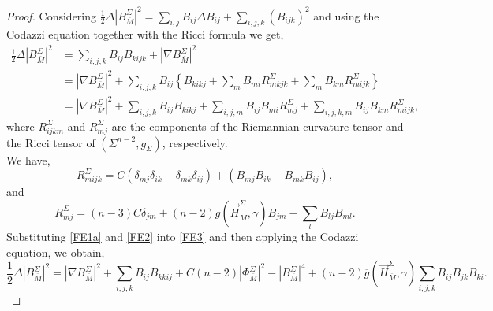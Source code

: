 \documentclass[11pt]{amsart}
\numberwithin{equation}{section}
\begin{document}
\begin{proof}
    Considering $\frac{1}{2} \Delta \left|B^{\Sigma}_{\overline{M}}\right|^2= \sum\limits_{i, j} B_{ij} \Delta B_{ij}+ \sum\limits_{i, j, k} (B_{ijk})^2$ and using the Codazzi equation together with the Ricci formula \cite{cheng} we get,
    \begin{align}\label{FE3}
        \frac{1}{2} \Delta \left|B^{\Sigma}_{\overline{M}}\right|^2 &= \sum_{i, j, k} B_{ij} B_{kijk}+ \left|\nabla B^{\Sigma}_{\overline{M}}\right|^2 \nonumber\\
                                          &= \left|\nabla B^{\Sigma}_{\overline{M}}\right|^2+ \sum_{i, j, k} B_{ij} \left\{B_{kikj}+\sum_m B_{mi} R^{\Sigma}_{mkjk}+\sum_m B_{km} R^{\Sigma}_{mijk}\right\} \nonumber\\
                                          &= \left|\nabla B^{\Sigma}_{\overline{M}}\right|^2+ \sum_{i, j, k} B_{ij} B_{kikj}+\sum_{i, j, m} B _{ij} B_{mi} R^{\Sigma}_{mj}+\sum_{i, j, k, m} B_{ij} B_{km} R^{\Sigma}_{mijk},
    \end{align}
    where $ R^{\Sigma}_{ijkm} $ and $R^{\Sigma}_{mj}$ are the components of the Riemannian curvature tensor and the Ricci tensor of $(\Sigma^{n-2}, g_{\Sigma})$, respectively.\\
    We have,
    \begin{equation}\label{FE2}
        R^{\Sigma}_{mijk}= C (\delta_{mj} \delta_{ik}- \delta_{mk} \delta_{ij})+(B_{mj} B_{ik}- B_{mk} B_{ij}),
    \end{equation}
    and
    \begin{equation}\label{FE1a}
        R^{\Sigma}_{mj}= (n-3) C \delta_{jm}+ (n-2) \overline{g}\left(\vec{H}^{\Sigma}_{\overline{M}}, \gamma \right) B_{jm}- \sum_l B_{lj} B_{ml}.
    \end{equation}
    Substituting \eqref{FE1a} and \eqref{FE2} into \eqref{FE3} and then applying the Codazzi equation, we obtain,
    \begin{equation*}
        \frac{1}{2} \Delta \left|B^{\Sigma}_{\overline{M}}\right|^2= \left|\nabla B^{\Sigma}_{\overline{M}}\right|^2+ \sum_{i, j, k} B_{ij} B_{kkij}+ C(n-2) \left|\Phi^{\Sigma}_{\overline{M}}\right|^2-\left|B^{\Sigma}_{\overline{M}}\right|^4+(n-2) \overline{g}\left(\vec{H}^{\Sigma}_{\overline{M}}, \gamma \right)  \sum_{i, j, k} B_{ij} B_{jk} B_{ki}.
    \end{equation*}
\end{proof}
\end{document}
